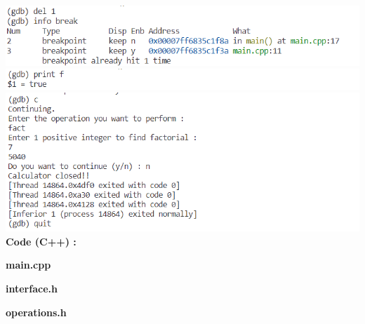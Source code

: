 \documentclass{article}
\begin{document}
\includegraphics[scale=0.70]{cpp_debug_10}\\
\includegraphics[scale=0.70]{cpp_debug_11}\\
\includegraphics[scale=0.70]{cpp_debug_12}\\

\textbf{\bf Code (C++) : \\}

\textbf{\bf main.cpp}

\textbf{\bf interface.h}

\textbf{\bf operations.h}

\pagebreak
\end{document}
